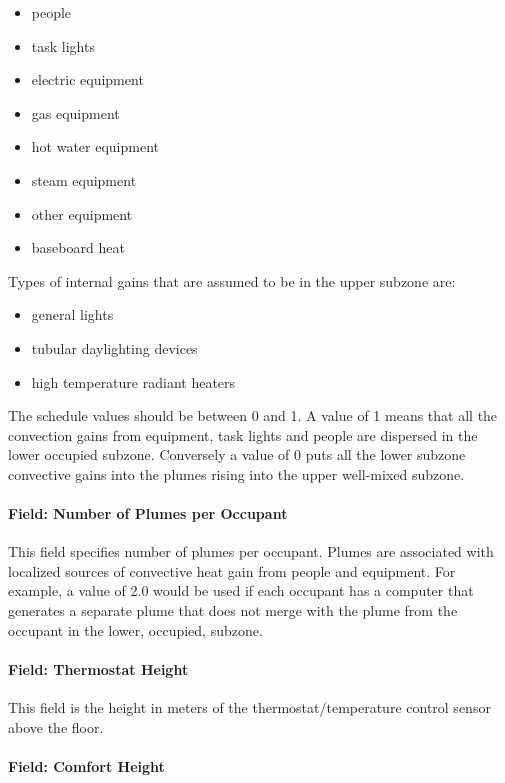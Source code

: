 \begin{itemize}
\item
  people
\item
  task lights
\item
  electric equipment
\item
  gas equipment
\item
  hot water equipment
\item
  steam equipment
\item
  other equipment
\item
  baseboard heat
\end{itemize}

Types of internal gains that are assumed to be in the upper subzone are:

\begin{itemize}
\item
  general lights
\item
  tubular daylighting devices
\item
  high temperature radiant heaters
\end{itemize}

The schedule values should be between 0 and 1. A value of 1 means that all the convection gains from equipment, task lights and people are dispersed in the lower occupied subzone. Conversely a value of 0 puts all the lower subzone convective gains into the plumes rising into the upper well-mixed subzone.

\paragraph{Field: Number of Plumes per Occupant}\label{field-number-of-plumes-per-occupant}

This field specifies number of plumes per occupant. Plumes are associated with localized sources of convective heat gain from people and equipment. For example, a value of 2.0 would be used if each occupant has a computer that generates a separate plume that does not merge with the plume from the occupant in the lower, occupied, subzone.

\paragraph{Field: Thermostat Height}\label{field-thermostat-height-1}

This field is the height in meters of the thermostat/temperature control sensor above the floor.

\paragraph{Field: Comfort Height}\label{field-comfort-height}

